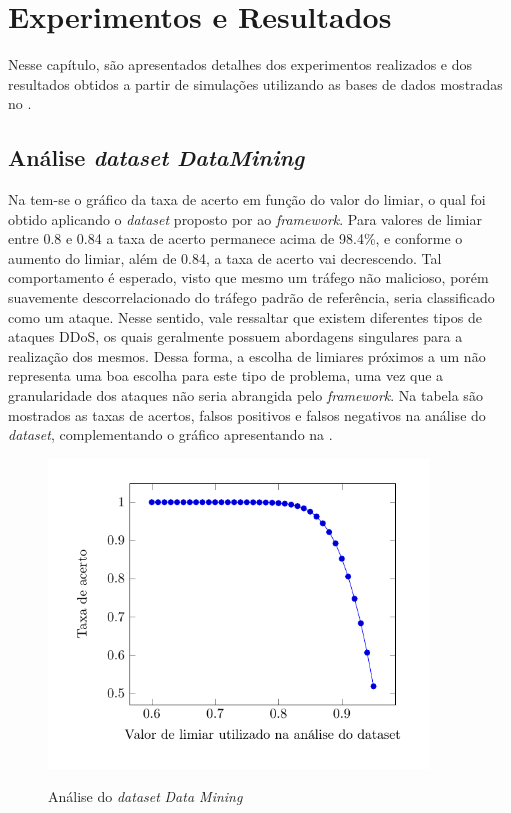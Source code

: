 \chapter[Resultados]{Experimentos e Resultados}
\label{resultados}
Nesse capítulo, são apresentados detalhes dos experimentos realizados e dos resultados obtidos a partir de simulações utilizando as bases de dados mostradas no .

\section{Análise \textit{dataset DataMining}}  
Na  tem-se o gráfico da taxa de acerto em função do valor do limiar, o qual foi obtido aplicando o \textit{dataset} proposto por \cite{DataMining} ao \textit{framework}. Para valores de limiar entre 0.8 e 0.84 a taxa de acerto permanece acima de 98.4\%, e conforme o aumento do limiar, além de 0.84, a taxa de acerto vai decrescendo. Tal comportamento é esperado, visto que mesmo um tráfego não malicioso, porém suavemente descorrelacionado do tráfego padrão de referência, seria classificado como um ataque. Nesse sentido, vale ressaltar que existem diferentes tipos de ataques DDoS, os quais geralmente possuem abordagens singulares para a realização dos mesmos. Dessa forma, a escolha de limiares próximos a um não representa uma boa escolha para este tipo de problema, uma vez que a granularidade dos ataques não seria abrangida pelo \textit{framework}. Na tabela  são mostrados  as taxas de acertos, falsos positivos e falsos negativos na análise do \textit{dataset}, complementando o gráfico apresentando na .

 \begin{figure}[htb]
 	\centering
 	\caption{Análise do \textit{dataset} \textit{Data Mining} }
 	\includegraphics[width=0.9\textwidth]{figs/results80-95Mining.pdf}\\
 	\label{fig:ResultsMining}
 \end{figure}
 
